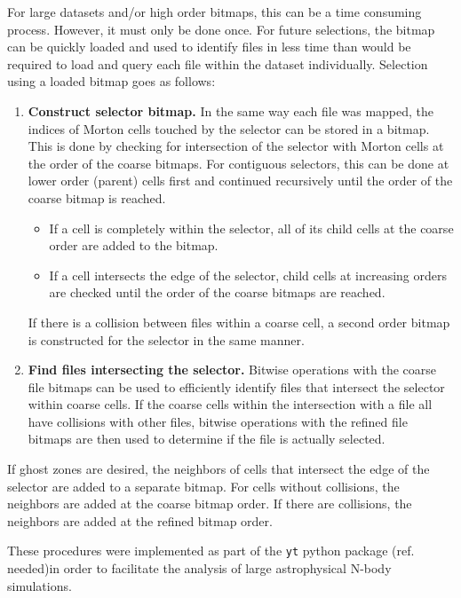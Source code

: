 \documentclass[apjl]{emulateapj}
\newcommand{\todo}[1]{{\color{red}{#1}}}
\newcommand{\addref}{{\color{red}(ref. needed)}}
\begin{document}
For large datasets and/or high order bitmaps, this can be a time consuming process. However, it must only be done once. For future selections, the bitmap can be quickly loaded and used to identify files in less time than would be required to load and query each file within the dataset individually. Selection using a loaded bitmap goes as follows:
\begin{enumerate}
\item {\bf Construct selector bitmap.} In the same way each file was mapped, the indices of Morton cells touched by the selector can be stored in a bitmap. This is done by checking for intersection of the selector with Morton cells at the order of the coarse bitmaps. For contiguous selectors, this can be done at lower order (parent) cells first and continued recursively until the order of the coarse bitmap is reached. 
\begin{itemize}
\item If a cell is completely within the selector, all of its child cells at the coarse order are added to the bitmap. 
\item If a cell intersects the edge of the selector, child cells at increasing orders are checked until the order of the coarse bitmaps are reached. 
\end{itemize}
If there is a collision between files within a coarse cell, a second order bitmap is constructed for the selector in the same manner.
\item {\bf Find files intersecting the selector.} Bitwise operations with the coarse file bitmaps can be used to efficiently identify files that intersect the selector within coarse cells. If the coarse cells within the intersection with a file all have collisions with other files, bitwise operations with the refined file bitmaps are then used to determine if the file is actually selected.
\end{enumerate}

If ghost zones are desired, the neighbors of cells that intersect the edge of the selector are added to a separate bitmap. For cells without collisions, the neighbors are added at the coarse bitmap order. If there are collisions, the neighbors are added at the refined bitmap order.

These procedures were implemented as part of the {\tt yt} python package \addref in order to facilitate the analysis of large astrophysical N-body simulations.
\todo{more/separate code section...?}

\end{document}
